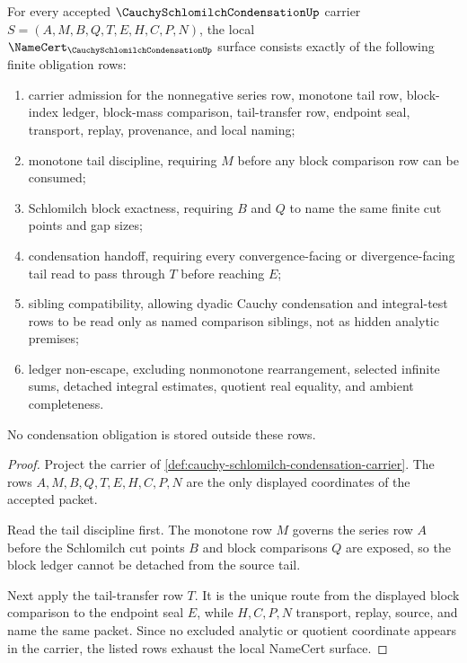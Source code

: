 \begin{theorem}
\label{thm:cauchy-schlomilch-condensation-namecert-obligations}
For every accepted $\CauchySchlomilchCondensationUp$ carrier $S=(A,M,B,Q,T,E,H,C,P,N)$, the local $\NameCert_{\CauchySchlomilchCondensationUp}$ surface consists exactly of the following finite obligation rows:
\begin{enumerate}
\item carrier admission for the nonnegative series row, monotone tail row, block-index ledger, block-mass comparison, tail-transfer row, endpoint seal, transport, replay, provenance, and local naming;
\item monotone tail discipline, requiring $M$ before any block comparison row can be consumed;
\item Schlomilch block exactness, requiring $B$ and $Q$ to name the same finite cut points and gap sizes;
\item condensation handoff, requiring every convergence-facing or divergence-facing tail read to pass through $T$ before reaching $E$;
\item sibling compatibility, allowing dyadic Cauchy condensation and integral-test rows to be read only as named comparison siblings, not as hidden analytic premises;
\item ledger non-escape, excluding nonmonotone rearrangement, selected infinite sums, detached integral estimates, quotient real equality, and ambient completeness.
\end{enumerate}
No condensation obligation is stored outside these rows.
\end{theorem}
\begin{proof}
Project the carrier of \autoref{def:cauchy-schlomilch-condensation-carrier}. The rows $A,M,B,Q,T,E,H,C,P,N$ are the only displayed coordinates of the accepted packet.

Read the tail discipline first. The monotone row $M$ governs the series row $A$ before the Schlomilch cut points $B$ and block comparisons $Q$ are exposed, so the block ledger cannot be detached from the source tail.

Next apply the tail-transfer row $T$. It is the unique route from the displayed block comparison to the endpoint seal $E$, while $H,C,P,N$ transport, replay, source, and name the same packet. Since no excluded analytic or quotient coordinate appears in the carrier, the listed rows exhaust the local NameCert surface.
\end{proof}

